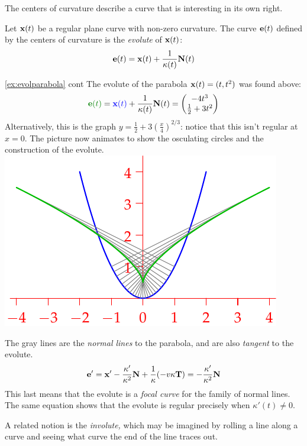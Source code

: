 The centers of curvature describe a curve that is interesting in its own right.

\begin{defn}{}{}
	Let ${\mathbf{x}}(t)$ be a regular plane curve with non-zero curvature. The curve ${\mathbf{e}}(t)$ defined by the centers of curvature is the \emph{evolute} of ${\mathbf{x}}(t)$:
	\[
		{\mathbf{e}}(t)={\mathbf{x}}(t)+\frac 1{\kappa(t)}{\mathbf{N}}(t)
	\]
\end{defn}

\begin{example*}[lower separated=false, sidebyside, sidebyside align=top seam, sidebyside gap=0pt, righthand width=0.49\linewidth]{\ref{ex:evolparabola} cont}{}
	The evolute of the parabola ${\mathbf{x}}(t)=(t,t^2)$ was found above:
	\[
	\textcolor{Green}{\ve(t)} =\textcolor{blue}{\vx(t)} +\frac 1{\kappa(t)}\vN(t) =\twovec{-4t^3}{\frac 12+3t^2}
	\]
	Alternatively, this is the graph $y=\frac 12+3\left(\frac x4\right)^{2/3}$: notice that this isn't regular at $x=0$.\smallbreak
	The picture now animates to show the osculating circles and the construction of the evolute.
	\tcblower
	\flushright
	\href{http://math.uci.edu/~ndonalds/math162a/radii-evolute.html}{\includegraphics[scale=1]{radii-evolute2}}
\end{example*}

The gray lines are the \emph{normal lines} to the parabola, and are also \emph{tangent} to the evolute.
\[
	{\mathbf{e}}'={\mathbf{x}}'-\frac{\kappa'}{\kappa^2}{\mathbf{N}}+\frac 1\kappa(-v\kappa{\mathbf{T}})=-\frac{\kappa'}{\kappa^2}{\mathbf{N}}
\]
This last means that the evolute is a \emph{focal curve} for the family of normal lines. The same equation shows that the evolute is regular precisely when $\kappa'(t)\neq 0$. 

\vfil

\goodbreak


A related notion is the \emph{involute,} which may be imagined by rolling a line along a curve and seeing what curve the end of the line traces out.

